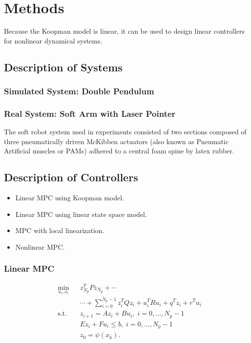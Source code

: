 \section{Methods}
\label{sec:methods}

Because the Koopman model is linear, it can be used to design linear controllers for nonlinear dynamical systems.


\subsection{Description of Systems}

\subsubsection{Simulated System: Double Pendulum}

\subsubsection{Real System: Soft Arm with Laser Pointer}
The soft robot system used in experiments consisted of two sections composed of three pneumatically driven McKibben actuators (also known as Pneumatic Artificial muscles or PAMs) adhered to a central foam spine by latex rubber.


\subsection{Description of Controllers}

\begin{itemize}
    \item Linear MPC using Koopman model.
    \item Linear MPC using linear state space model.
    \item MPC with local linearization.
    \item Nonlinear MPC.
\end{itemize}

\subsubsection{Linear MPC}

\begin{equation}
\begin{aligned}
& \underset{u_{i} , x_{i}}{\text{min}}
& & z_{N_p}^{T} P z_{N_p} + \cdots \\
&&& \cdots + \sum_{i=0}^{N_p - 1} z_i^T Q z_i + u_i^T R u_i + q^T z_i + r^T u_i\\
& \text{s.t.}
& & z_{i+1} = A z_i + B u_i , \; i = 0 , \ldots , N_p - 1 \\
&&& E z_i + F u_i \leq b , \; i = 0 , \ldots , N_p - 1 \\
&&& z_0 = \psi(x_k).
\end{aligned}
\end{equation}


